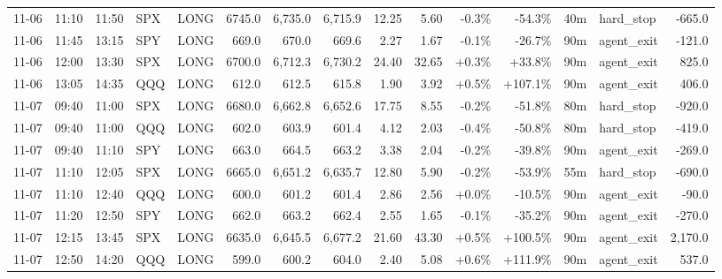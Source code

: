 \documentclass[11pt,a4paper,twoside]{article}
\begin{document}
\begin{landscape}
\begin{center}
\begin{longtable}{>{\color{txtmain}}l l l l l r r r r r r r r >{\color{txtmain}}l r}
11-06 & 11:10 & 11:50 & SPX & LONG & 6745.0 & 6,735.0 & 6,715.9 & 12.25 & 5.60 & \textcolor{lossred}{-0.3\%} & \textcolor{lossred}{-54.3\%} & 40m & hard\_stop & \textcolor{lossred}{-665.0} \\
11-06 & 11:45 & 13:15 & SPY & LONG & 669.0 & 670.0 & 669.6 & 2.27 & 1.67 & \textcolor{lossred}{-0.1\%} & \textcolor{lossred}{-26.7\%} & 90m & agent\_exit & \textcolor{lossred}{-121.0} \\
11-06 & 12:00 & 13:30 & SPX & LONG & 6700.0 & 6,712.3 & 6,730.2 & 24.40 & 32.65 & \textcolor{wingreen}{+0.3\%} & \textcolor{wingreen}{+33.8\%} & 90m & agent\_exit & \textcolor{wingreen}{825.0} \\
11-06 & 13:05 & 14:35 & QQQ & LONG & 612.0 & 612.5 & 615.8 & 1.90 & 3.92 & \textcolor{wingreen}{+0.5\%} & \textcolor{wingreen}{+107.1\%} & 90m & agent\_exit & \textcolor{wingreen}{406.0} \\
11-07 & 09:40 & 11:00 & SPX & LONG & 6680.0 & 6,662.8 & 6,652.6 & 17.75 & 8.55 & \textcolor{lossred}{-0.2\%} & \textcolor{lossred}{-51.8\%} & 80m & hard\_stop & \textcolor{lossred}{-920.0} \\
11-07 & 09:40 & 11:00 & QQQ & LONG & 602.0 & 603.9 & 601.4 & 4.12 & 2.03 & \textcolor{lossred}{-0.4\%} & \textcolor{lossred}{-50.8\%} & 80m & hard\_stop & \textcolor{lossred}{-419.0} \\
11-07 & 09:40 & 11:10 & SPY & LONG & 663.0 & 664.5 & 663.2 & 3.38 & 2.04 & \textcolor{lossred}{-0.2\%} & \textcolor{lossred}{-39.8\%} & 90m & agent\_exit & \textcolor{lossred}{-269.0} \\
11-07 & 11:10 & 12:05 & SPX & LONG & 6665.0 & 6,651.2 & 6,635.7 & 12.80 & 5.90 & \textcolor{lossred}{-0.2\%} & \textcolor{lossred}{-53.9\%} & 55m & hard\_stop & \textcolor{lossred}{-690.0} \\
11-07 & 11:10 & 12:40 & QQQ & LONG & 600.0 & 601.2 & 601.4 & 2.86 & 2.56 & \textcolor{wingreen}{+0.0\%} & \textcolor{lossred}{-10.5\%} & 90m & agent\_exit & \textcolor{lossred}{-90.0} \\
11-07 & 11:20 & 12:50 & SPY & LONG & 662.0 & 663.2 & 662.4 & 2.55 & 1.65 & \textcolor{lossred}{-0.1\%} & \textcolor{lossred}{-35.2\%} & 90m & agent\_exit & \textcolor{lossred}{-270.0} \\
11-07 & 12:15 & 13:45 & SPX & LONG & 6635.0 & 6,645.5 & 6,677.2 & 21.60 & 43.30 & \textcolor{wingreen}{+0.5\%} & \textcolor{wingreen}{+100.5\%} & 90m & agent\_exit & \textcolor{wingreen}{2,170.0} \\
11-07 & 12:50 & 14:20 & QQQ & LONG & 599.0 & 600.2 & 604.0 & 2.40 & 5.08 & \textcolor{wingreen}{+0.6\%} & \textcolor{wingreen}{+111.9\%} & 90m & agent\_exit & \textcolor{wingreen}{537.0} \\

\end{longtable}
\end{center}
\end{landscape}
\end{document}
